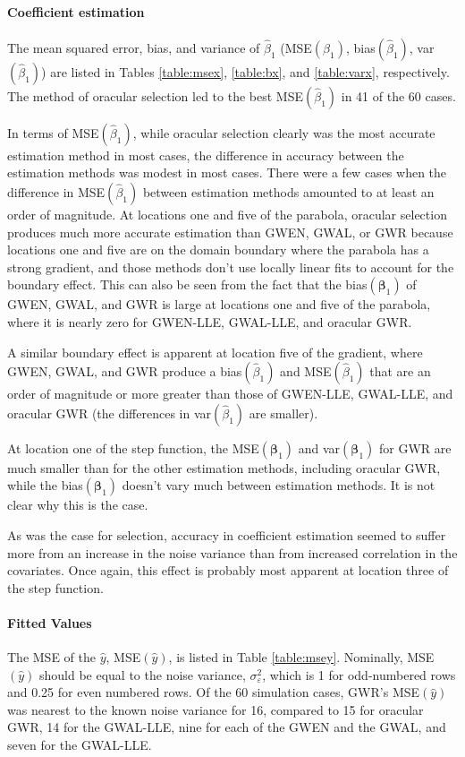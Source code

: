 \documentclass[authoryear, review, 11pt]{elsarticle}
\begin{document}
	\paragraph{Coefficient estimation} The mean squared error, bias, and variance of $\hat{\beta}_1$ (MSE$(\beta_1)$, bias$(\hat{\beta}_1)$, var$(\hat{\beta}_1)$) are listed in Tables \ref{table:msex}, \ref{table:bx}, and \ref{table:varx}, respectively. The method of oracular selection led to the best MSE$(\hat{\beta}_1)$ in 41 of the 60 cases.
	
	In terms of MSE$(\hat{\beta}_1)$, while oracular selection clearly was the most accurate estimation method in most cases, the difference in accuracy between the estimation methods was modest in most cases. There were a few cases when the difference in MSE$(\hat{\beta}_1)$ between estimation methods amounted to at least an order of magnitude. At locations one and five of the parabola, oracular selection produces much more accurate estimation than GWEN, GWAL, or GWR because locations one and five are on the domain boundary where the parabola has a strong gradient, and those methods don't use locally linear fits to account for the boundary effect. This can also be seen from the fact that the bias$(\bm{\beta}_1)$ of GWEN, GWAL, and GWR is large at locations one and five of the parabola, where it is nearly zero for GWEN-LLE, GWAL-LLE, and oracular GWR.
	
	A similar boundary effect is apparent at location five of the gradient, where GWEN, GWAL, and GWR produce a bias$(\hat{\beta}_1)$ and MSE$(\hat{\beta}_1)$ that are an order of magnitude or more greater than those of GWEN-LLE, GWAL-LLE, and oracular GWR (the differences in var$(\hat{\beta}_1)$ are smaller).
	
	At location one of the step function, the MSE$(\bm{\beta}_1)$ and var$(\bm{\beta}_1)$ for GWR are much smaller than for the other estimation methods, including oracular GWR, while the bias$(\bm{\beta}_1)$ doesn't vary much between estimation methods. It is not clear why this is the case.
		
	As was the case for selection, accuracy in coefficient estimation seemed to suffer more from an increase in the noise variance than from increased correlation in the covariates. Once again, this effect is probably most apparent at location three of the step function.	
	
	\paragraph{Fitted Values} The MSE of the $\hat{y}$, MSE$(\hat{y})$, is listed in Table \ref{table:msey}. Nominally, MSE$(\hat{y})$ should be equal to the noise variance, $\sigma_{\varepsilon}^2$, which is 1 for odd-numbered rows and 0.25 for even numbered rows. Of the 60 simulation cases, GWR's MSE$(\hat{y})$ was nearest to the known noise variance for 16, compared to 15 for oracular GWR, 14 for the GWAL-LLE, nine for each of the GWEN and the GWAL, and seven for the GWAL-LLE.
	
\end{document}
